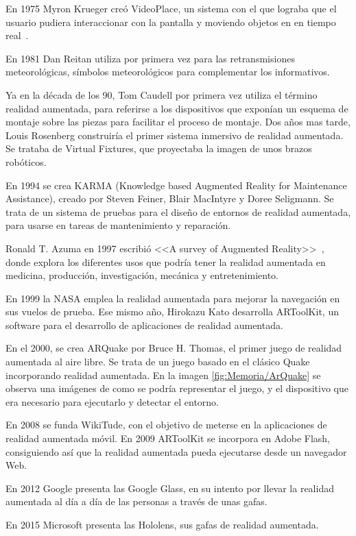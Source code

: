 
En 1975 Myron Krueger creó VideoPlace, un sistema con el que lograba que el usuario pudiera interaccionar con la pantalla y moviendo objetos en en tiempo real~\cite{ARevolution}.



En 1981 Dan Reitan utiliza por primera vez para las retransmisiones meteorológicas, símbolos meteorológicos para complementar los informativos.

Ya en la década de los 90, Tom Caudell por primera vez utiliza el término realidad aumentada, para referirse a los dispositivos que exponían un esquema de montaje sobre las piezas para facilitar el proceso de montaje. 
Dos años mas tarde, Louis Rosenberg construiría el primer sistema inmersivo de realidad aumentada.  Se trataba de Virtual Fixtures, que proyectaba la imagen de unos brazos robóticos.

En 1994 se crea KARMA (Knowledge based Augmented Reality for Maintenance Assistance), creado por  Steven Feiner, Blair MacIntyre y Doree Seligmann. Se trata de un sistema de pruebas para el diseño de entornos de realidad aumentada, para usarse en tareas de mantenimiento y reparación.

Ronald T. Azuma  en 1997 escribió <<A survey of Augmented Reality>>~\cite{azuma1997survey}, donde explora los diferentes usos que podría tener la realidad aumentada en medicina, producción, investigación, mecánica y entretenimiento.

En 1999 la NASA emplea la realidad aumentada para mejorar la navegación en sus vuelos de prueba. Ese mismo año, Hirokazu Kato desarrolla ARToolKit, un software para el desarrollo de aplicaciones de realidad aumentada.



En el 2000, se crea ARQuake por Bruce H. Thomas, el primer juego de realidad aumentada al aire libre. Se trata de un juego basado en el clásico Quake incorporando realidad aumentada. En la imagen \ref{fig:Memoria/ArQuake} se observa una imágenes de como se podría representar el juego, y el dispositivo que era necesario para ejecutarlo y detectar el entorno.


En 2008 se funda WikiTude, con el objetivo de meterse en la aplicaciones de realidad aumentada móvil. 
En 2009 ARToolKit se incorpora en Adobe Flash, consiguiendo así que la realidad aumentada pueda ejecutarse desde un navegador Web.

En 2012 Google presenta las Google Glass, en su intento por llevar la realidad aumentada al día a día de las personas a través de unas gafas.  

En 2015 Microsoft presenta las Hololens, sus gafas de realidad aumentada.





	
	
	
